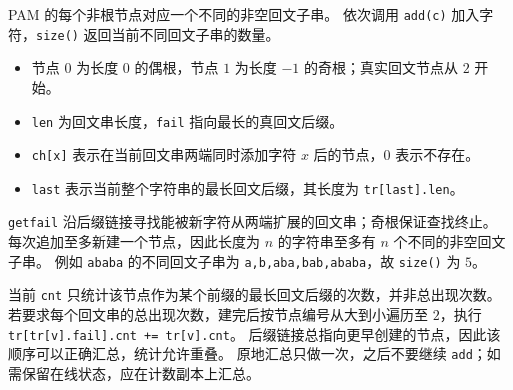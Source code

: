 PAM 的每个非根节点对应一个不同的非空回文子串。
依次调用 \texttt{add(c)} 加入字符，\texttt{size()} 返回当前不同回文子串的数量。

\begin{itemize}
  \item 节点 $0$ 为长度 $0$ 的偶根，节点 $1$ 为长度 $-1$ 的奇根；真实回文节点从 $2$ 开始。
  \item \texttt{len} 为回文串长度，\texttt{fail} 指向最长的真回文后缀。
  \item \texttt{ch[x]} 表示在当前回文串两端同时添加字符 $x$ 后的节点，$0$ 表示不存在。
  \item \texttt{last} 表示当前整个字符串的最长回文后缀，其长度为 \texttt{tr[last].len}。
\end{itemize}

\texttt{getfail} 沿后缀链接寻找能被新字符从两端扩展的回文串；奇根保证查找终止。
每次追加至多新建一个节点，因此长度为 $n$ 的字符串至多有 $n$ 个不同的非空回文子串。
例如 \texttt{ababa} 的不同回文子串为 \texttt{a,b,aba,bab,ababa}，故 \texttt{size()} 为 $5$。

\begin{icpcwarning}[出现次数]
当前 \texttt{cnt} 只统计该节点作为某个前缀的最长回文后缀的次数，并非总出现次数。
若要求每个回文串的总出现次数，建完后按节点编号从大到小遍历至 $2$，执行 \texttt{tr[tr[v].fail].cnt += tr[v].cnt}。
后缀链接总指向更早创建的节点，因此该顺序可以正确汇总，统计允许重叠。
原地汇总只做一次，之后不要继续 \texttt{add}；如需保留在线状态，应在计数副本上汇总。
\end{icpcwarning}
